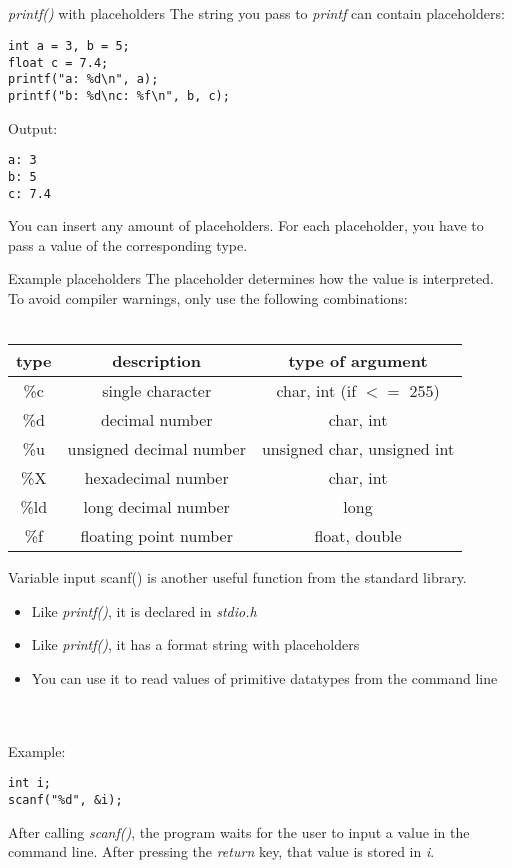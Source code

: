 \subsection{}
\begin{frame}[fragile]{\textit{printf()} with placeholders}
	The string you pass to \textit{printf} can contain placeholders:
	\begin{lstlisting}[numbers=none]
int a = 3, b = 5;
float c = 7.4;
printf("a: %d\n", a);
printf("b: %d\nc: %f\n", b, c);
\end{lstlisting}
Output:\begin{lstlisting}[numbers=none]
a: 3
b: 5
c: 7.4
\end{lstlisting}
You can insert any amount of placeholders. For each placeholder, you have to pass a value of the corresponding type.
\end{frame}
\begin{frame}{Example placeholders}
	The placeholder determines how the value is interpreted.
	To avoid compiler warnings, only use the following combinations: \\ \ \\
	\begin{tabular}{|c|c|c|}
		\hline
		\textbf{type} & \textbf{description} & \textbf{type of argument} \\\hline
		\%c & single character & char, int (if $<=$ 255) \\\hline
		\%d & decimal number & char, int \\\hline
		\%u & unsigned decimal number & unsigned char, unsigned int \\\hline
		\%X & hexadecimal number & char, int \\\hline
		\%ld & long decimal number & long \\\hline
		\%f & floating point number & float, double \\\hline
	\end{tabular}
\end{frame}
\begin{frame}[fragile]{Variable input}
	scanf() is another useful function from the standard library.
	\begin{itemize}
		\item Like \textit{printf()}, it is declared in \textit{stdio.h}
		\item Like \textit{printf()}, it has a format string with placeholders
		\item You can use it to read values of primitive datatypes from the command line
	\end{itemize}
	\ \\ \ \\ Example:
	\begin{lstlisting}[numbers=none]
int i;
scanf("%d", &i);	
\end{lstlisting}
	After calling \textit{scanf()}, the program waits for the user to input a value in the command line.
	After pressing the \textit{return} key, that value is stored in \textit{i}.
\end{frame}

